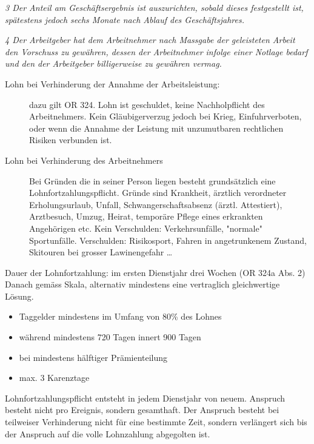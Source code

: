 \textit{3 Der Anteil am Geschäftsergebnis ist auszurichten, sobald dieses festgestellt ist, spätestens jedoch sechs Monate nach Ablauf des Geschäftsjahres.}

\textit{4 Der Arbeitgeber hat dem Arbeitnehmer nach Massgabe der geleisteten Arbeit den Vorschuss zu gewähren, dessen der Arbeitnehmer infolge einer Notlage bedarf und den der Arbeitgeber billigerweise zu gewähren vermag.}

\begin{description}
  \item[Lohn bei Verhinderung der Annahme der Arbeitsleistung:] dazu gilt OR 324. Lohn ist geschuldet, keine Nachholpflicht des Arbeitnehmers. Kein Gläubigerverzug jedoch bei Krieg, Einfuhrverboten, oder wenn die Annahme der Leistung mit unzumutbaren rechtlichen Risiken verbunden ist. 
  \item[Lohn bei Verhinderung des Arbeitnehmers] Bei Gründen die in seiner Person liegen besteht grundsätzlich eine Lohnfortzahlungspflicht. Gründe sind Krankheit, ärztlich verordneter Erholungsurlaub, Unfall, Schwangerschaftsabsenz (ärztl. Attestiert), Arztbesuch, Umzug, Heirat, temporäre Pflege eines erkrankten Angehörigen etc.
  Kein Verschulden: Verkehrsunfälle, "normale" Sportunfälle. Verschulden: Risikosport, Fahren in angetrunkenem Zustand, Skitouren bei grosser Lawinengefahr \ldots 
\end{description}

\noindent
Dauer der Lohnfortzahlung: im ersten Dienstjahr drei Wochen (OR 324a Abs. 2)
Danach gemäss Skala, alternativ mindestens eine vertraglich gleichwertige Lösung.
\begin{itemize}
  \item Taggelder mindestens im Umfang von 80\% des Lohnes
  \item während mindestens 720 Tagen innert 900 Tagen
  \item bei mindestens hälftiger Prämienteilung
  \item max. 3 Karenztage
\end{itemize}

\noindent
Lohnfortzahlungspflicht entsteht in jedem Dienstjahr von neuem. Anspruch besteht nicht pro Ereignis, sondern gesamthaft. Der Anspruch besteht bei teilweiser Verhinderung nicht für eine bestimmte Zeit, sondern verlängert sich bis der Anspruch auf die volle Lohnzahlung abgegolten ist.
\vspace{3mm}

